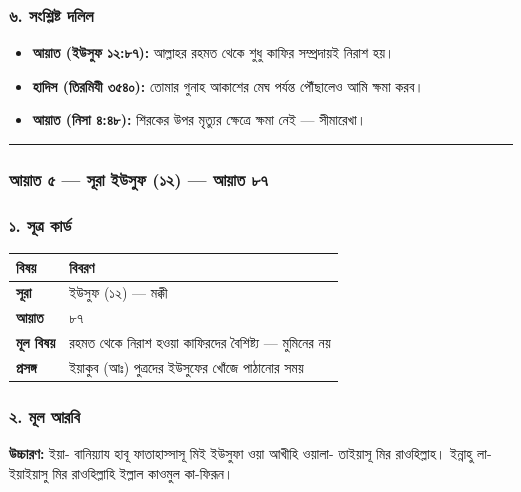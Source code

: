 \subsubsection*{৬. সংশ্লিষ্ট দলিল}

\begin{itemize}
\item \textbf{আয়াত (ইউসুফ ১২:৮৭):} আল্লাহর রহমত থেকে শুধু কাফির সম্প্রদায়ই নিরাশ হয়।
\item \textbf{হাদিস (তিরমিযী ৩৫৪০):} তোমার গুনাহ আকাশের মেঘ পর্যন্ত পৌঁছালেও আমি ক্ষমা করব।
\item \textbf{আয়াত (নিসা ৪:৪৮):} শিরকের উপর মৃত্যুর ক্ষেত্রে ক্ষমা নেই — সীমারেখা।
\end{itemize}
\medskip\hrule\medskip

\subsubsection*{আয়াত ৫ — সূরা ইউসুফ (১২) — আয়াত ৮৭}

\subsubsection*{১. সূত্র কার্ড}

\begin{table}[h]\centering\small
\begin{tabular}{ll}
বিষয় & বিবরণ \\
\hline
\textbf{সূরা} & ইউসুফ (১২) — মক্কী \\
\textbf{আয়াত} & ৮৭ \\
\textbf{মূল বিষয়} & রহমত থেকে নিরাশ হওয়া কাফিরদের বৈশিষ্ট্য — মুমিনের নয় \\
\textbf{প্রসঙ্গ} & ইয়াকুব (আঃ) পুত্রদের ইউসুফের খোঁজে পাঠানোর সময় \\
\hline
\end{tabular}
\end{table}

\subsubsection*{২. মূল আরবি}

\begin{center}\end{center}
\textbf{উচ্চারণ:} ইয়া- বানিয়্যায হাবূ ফাতাহাস্সাসূ মিই ইউসুফা ওয়া আখীহি ওয়ালা- তাইয়াসূ মির রাওহিল্লাহ। ইন্নাহু লা- ইয়াইয়াসু মির রাওহিল্লাহি ইল্লাল কাওমুল কা-ফিরূন।

